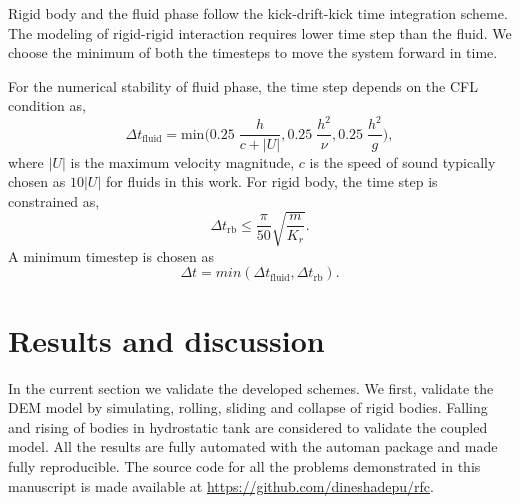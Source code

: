 Rigid body and the fluid phase follow the kick-drift-kick time integration
scheme. The modeling of rigid-rigid interaction requires lower time step than the fluid. We choose the minimum of both the timesteps to move the system forward
in time.

For the numerical stability of fluid phase, the time step depends on the CFL condition as,
\begin{equation}
  \label{eq:rfc:time-step-cfl}
  \Delta t_{\text{fluid}} = \mathrm{min} \bigg( 0.25 \; \frac{h}{c + |U|} ,  0.25 \; \frac{h^2}{\nu},  0.25 \; \frac{h^2}{g} \bigg),
\end{equation}
where $|U|$ is the maximum velocity magnitude, $c$ is the speed of sound
typically chosen as $10 |U|$ for fluids in this work. For rigid body, the time
step is constrained as,
\begin{equation}
  \label{eq:rfc:time-step-body-force}
  \Delta t_{\text{rb}} \leq \frac{\pi}{50} \sqrt{\frac{m}{K_r}}.
\end{equation}
A minimum timestep is chosen as
\begin{equation}
  \label{eq:rfc:time-step-body-force}
  \Delta t = min(\Delta t_{\text{fluid}}, \Delta t_{\text{rb}}).
\end{equation}



\FloatBarrier%
\section{Results and discussion}
\label{sec:rfc:results}
In the current section we validate the developed schemes. We first, validate the
DEM model by simulating, rolling, sliding and collapse of rigid bodies. Falling
and rising of bodies in hydrostatic tank are considered to validate the coupled
model. All the results are fully automated with the automan package
\citep{automan2018} and made fully reproducible. The source code for all the
problems demonstrated in this manuscript is made available at
\url{https://github.com/dineshadepu/rfc}.


\FloatBarrier%

